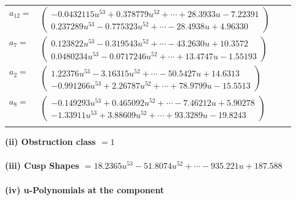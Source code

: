 \documentclass[1p]{elsarticle_modified}
\theoremstyle{definition}
\begin{document}
\begin{tabular}{m{7pt} m{180pt} m{7pt} m{180pt} }
\flushright $a_{12}=$&$\begin{pmatrix}-0.0432115 u^{53}+0.378779 u^{52}+\cdots+28.3933 u-7.22391\\0.237289 u^{53}-0.775323 u^{52}+\cdots-28.4938 u+4.96330\end{pmatrix}$ \\
\flushright $a_{7}=$&$\begin{pmatrix}0.123822 u^{53}-0.319543 u^{52}+\cdots-43.2630 u+10.3572\\0.0480234 u^{53}-0.0717246 u^{52}+\cdots+13.4747 u-1.55193\end{pmatrix}$ \\
\flushright $a_{2}=$&$\begin{pmatrix}1.22376 u^{53}-3.16315 u^{52}+\cdots-50.5427 u+14.6313\\-0.991266 u^{53}+2.26787 u^{52}+\cdots+78.9799 u-15.5513\end{pmatrix}$ \\
\flushright $a_{8}=$&$\begin{pmatrix}-0.149293 u^{53}+0.465092 u^{52}+\cdots-7.46212 u+5.90278\\-1.33911 u^{53}+3.88609 u^{52}+\cdots+93.3289 u-19.8243\end{pmatrix}$\\&\end{tabular}
\flushleft \textbf{(ii) Obstruction class $= 1$}\\~\\
\flushleft \textbf{(iii) Cusp Shapes $= 18.2365 u^{53}-51.8074 u^{52}+\cdots-935.221 u+187.588$}\\~\\
\newpage\renewcommand{\arraystretch}{1}
\flushleft \textbf{(iv) u-Polynomials at the component}\newline \\
\end{document}
